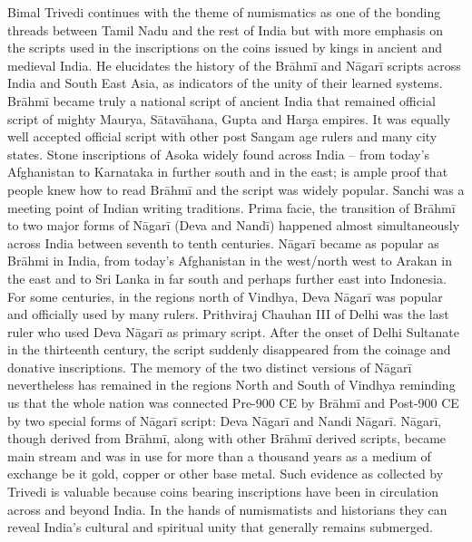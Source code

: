 Bimal Trivedi continues with the theme of numismatics as one of the bonding threads between Tamil Nadu and the rest of India but with more emphasis on the scripts used in the inscriptions on the coins issued by kings in ancient and medieval India. He elucidates the history of the Brāhmī and Nāgarī scripts across India and South East Asia, as indicators of the unity of their learned systems. Brāhmī became truly a national script of ancient India that remained official script of mighty Maurya, Sātavāhana, Gupta and Harşa empires. It was equally well accepted official script with other post Sangam age rulers and many city states. Stone inscriptions of Asoka widely found across India – from today’s Afghanistan to Karnataka in further south and in the east; is ample proof that people knew how to read Brāhmī and the script was widely popular. Sanchi was a meeting point of Indian writing traditions. Prima facie, the transition of Brāhmī to two major forms of Nāgarī (Deva and Nandī) happened almost simultaneously across India between seventh to tenth centuries. Nāgarī became as popular as Brāhmi in India, from today’s Afghanistan in the west/north west to Arakan in the east and to Sri Lanka in far south and perhaps further east into Indonesia. For some centuries, in the regions north of Vindhya, Deva Nāgarī was popular and officially used by many rulers. Prithviraj Chauhan III of Delhi was the last ruler who used Deva Nāgarī as primary script. After the onset of Delhi Sultanate in the thirteenth century, the script suddenly disappeared from the coinage and donative inscriptions. The memory of the two distinct versions of Nāgarī nevertheless has remained in the regions North and South of Vindhya reminding us that the whole nation was connected Pre-900 CE by Brāhmī and Post-900 CE by two special forms of Nāgarī script: Deva Nāgarī and Nandi Nāgarī. Nāgarī, though derived from Brāhmī, along with other Brāhmī derived scripts, became main stream and was in use for more than a thousand years as a medium of exchange be it gold, copper or other base metal. Such evidence as collected by Trivedi is valuable because coins bearing inscriptions have been in circulation across and beyond India. In the hands of numismatists and historians they can reveal India’s cultural and spiritual unity that generally remains submerged.

